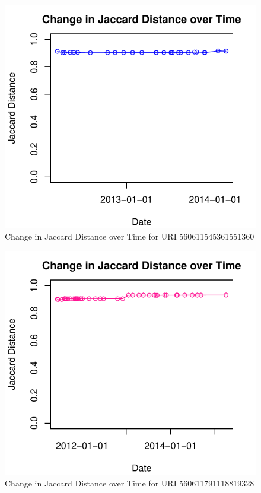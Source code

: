 \documentclass[a4paper,12pt]{article}
\begin{document}
\begin{figure}[H]
    \centering
    \includegraphics{stats/q3/560611545361551360.pdf}
    \caption{Change in Jaccard Distance over Time for URI 560611545361551360}
\end{figure}

\begin{figure}[H]
    \centering
    \includegraphics{stats/q3/560611791118819328.pdf}
    \caption{Change in Jaccard Distance over Time for URI 560611791118819328}
\end{figure}
\end{document}
